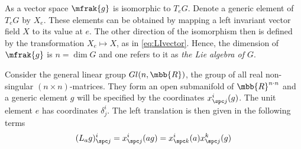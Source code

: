 \documentclass[10pt,reqno]{amsart}
\numberwithin{equation}{section}
\begin{document}
As a vector space $\mfrak{g}$ is isomorphic to $T_e G$. Denote a 
generic element of $T_e G$ by $X_e$. These elements can be 
obtained by mapping a left invariant vector field $X$ to its 
value at $e$. The other direction of the isomorphism then is 
defined by the transformation $X_e \mapsto X$, as in 
\eqref{eq:LIvector}. Hence, the dimension of $\mfrak{g}$  is $n = 
\dim G$ and one refers to it as \emph{the Lie algebra of $G$}.

\begin{example}
	Consider the general linear group $Gl(n,\mbb{R})$, the group of 
	all real non-singular $(n \times n)$-matrices. They form an 
	open submanifold of $\mbb{R}^{n\cdot n}$ and a generic element 
	$g$ will be specified by the coordinates $x^i_{\spc j}(g)$. The 
	unit element $e$ has coordinates $\delta^i_j$. The left 
	translation is then given in the following terms
	\begin{equation}
		(L_a g)^i_{\spc j} = x^i_{\spc j}(ag) = x^i_{\spc k}(a) 
		x^k_{\spc j}(g)
	\end{equation}


\end{example}
\end{document}
